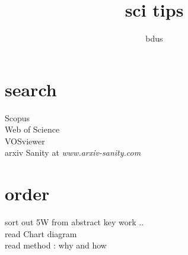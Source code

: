 \documentclass[11pt]{article}
\title{\textbf{sci tips}}
\author{bdus}
\date{}
\begin{document}
\maketitle

\section{search}
Scopus \\
Web of Science \\
VOSviewer \\
arxiv Sanity  at \emph{www.arxiv-sanity.com}

\section{order}

sort out  5W from abstract key work .. \\
read Chart diagram \\

read method : why and how
\end{document}
